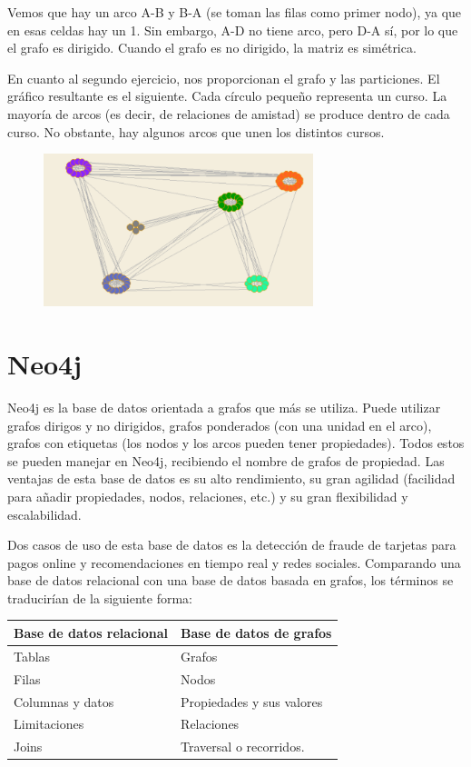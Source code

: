 Vemos que hay un arco A-B y B-A (se toman las filas como primer nodo), ya que en esas celdas hay un 1. Sin embargo, A-D no tiene arco, pero D-A sí, por lo que el grafo es dirigido. Cuando el grafo es no dirigido, la matriz es simétrica.

En cuanto al segundo ejercicio, nos proporcionan el grafo y las particiones. El gráfico resultante es el siguiente. Cada círculo pequeño representa un curso. La mayoría de arcos (es decir, de relaciones de amistad) se produce dentro de cada curso. No obstante, hay algunos arcos que unen los distintos cursos.
\begin{figure}[htbp]
\centering
\includegraphics[width = 0.7\textwidth]{figs/pajek-ex2.png}
\end{figure}

\section{Neo4j}
Neo4j es la base de datos orientada a grafos que más se utiliza. Puede utilizar grafos dirigos y no dirigidos, grafos ponderados (con una unidad en el arco), grafos con etiquetas (los nodos y los arcos pueden tener propiedades). Todos estos se pueden manejar en Neo4j, recibiendo el nombre de grafos de propiedad. Las ventajas de esta base de datos es su alto rendimiento, su gran agilidad (facilidad para añadir propiedades, nodos, relaciones, etc.) y su gran flexibilidad y escalabilidad. 

Dos casos de uso de esta base de datos es la detección de fraude de tarjetas para pagos online y recomendaciones en tiempo real y redes sociales. Comparando una base de datos relacional con una base de datos basada en grafos, los términos se traducirían de la siguiente forma:
\begin{table}[htbp]
\centering
\begin{tabular}{l l}
Base de datos relacional & Base de datos de grafos \\ \hline
Tablas & Grafos \\
Filas & Nodos \\
Columnas y datos & Propiedades y sus valores \\
Limitaciones & Relaciones \\
Joins & Traversal o recorridos.
\end{tabular}
\end{table}

